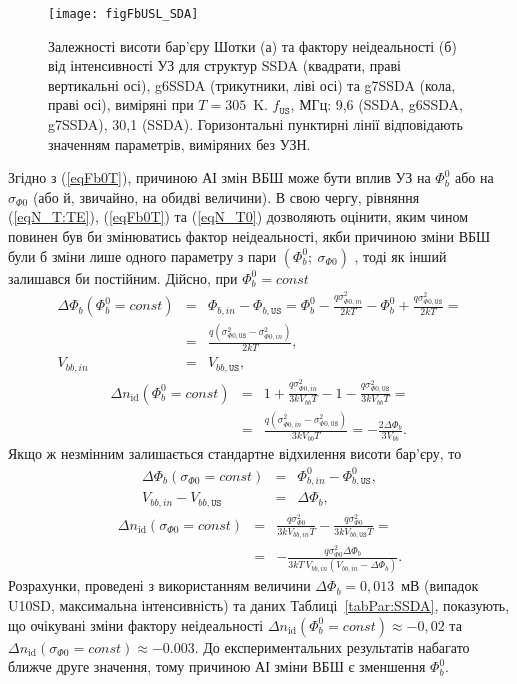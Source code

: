 \begin{figure}
\center
\texttt{[image: figFbUSL\_SDA]}
\caption{\label{figFbUSL_SDA}
Залежності висоти бар'єру Шотки (а) та фактору неідеальності (б)  від інтенсивності УЗ для
структур SSDA (квадрати, праві вертикальні осі), g6SSDA (трикутники, ліві осі) та g7SSDA (кола, праві осі), виміряні при $T=305$~K.
$f_\mathtt{US}$, МГц: 9,6 (SSDA, g6SSDA, g7SSDA), 30,1 (SSDA).
Горизонтальні пунктирні лінії відповідають значенням параметрів, виміряних без УЗН.
}%
\end{figure}

Згідно з (\ref{eqFb0T}), причиною АІ змін ВБШ може бути вплив УЗ на $\Phi_b^0$ або на $\sigma_{\Phi0}$ (або й, звичайно, на обидві величини).
В свою чергу, рівняння  (\ref{eqN_T:TE}), (\ref{eqFb0T}) та (\ref{eqN_T0}) дозволяють оцінити, яким чином повинен був би змінюватись фактор неідеальності,
якби причиною зміни ВБШ були б зміни лише одного параметру з пари $(\Phi_b^0;\:\sigma_{\Phi0})$ , тоді як інший залишався би постійним.
Дійсно, при $\Phi_b^0=const$
\begin{eqnarray*}
  \Delta \Phi_b (\Phi_b^0=const)&=& \Phi_{b,in}-\Phi_{b,\mathtt{US}}=\Phi_b^0-\frac{q\sigma^2_{\Phi0,in}}{2kT}-\Phi_b^0+\frac{q\sigma^2_{\Phi0,\mathtt{US}}}{2kT}= \\
   &=&\frac{q\left(\sigma^2_{\Phi0,\mathtt{US}}-\sigma^2_{\Phi0,in}\right)}{2kT}, \\
   V_{bb,in}&=&V_{bb,\mathtt{US}},
\end{eqnarray*}
\begin{eqnarray*}
  \Delta n_{\mathrm{id}} (\Phi_b^0=const)&=&1+\frac{q\sigma_{\Phi0,in}^2}{3kV_{bb}T}-1-\frac{q\sigma_{\Phi0,\mathtt{US}}^2}{3kV_{bb}T}=\\
  &=&\frac{q\left(\sigma^2_{\Phi0,in}-\sigma^2_{\Phi0,\mathtt{US}}\right)}{3kV_{bb}T}=-\frac{2\Delta \Phi_b}{3V_{bb}}.
\end{eqnarray*}
Якщо ж незмінним залишається стандартне відхилення висоти бар'єру, то
\begin{eqnarray*}
  \Delta \Phi_b (\sigma_{\Phi0}=const)&=&\Phi_{b,in}^0-\Phi_{b,\mathtt{US}}^0,\\
  V_{bb,in}-V_{bb,\mathtt{US}}&=&\Delta \Phi_b,
\end{eqnarray*}
\begin{eqnarray*}
  \Delta n_{\mathrm{id}} (\sigma_{\Phi0}=const)&=&\frac{q\sigma_{\Phi0}^2}{3kV_{bb,in}T}-\frac{q\sigma_{\Phi0}^2}{3kV_{bb,\mathtt{US}}T}=\\
  &=&-\frac{q\sigma_{\Phi0}^2\Delta \Phi_b}{3kT\,V_{bb,in}(V_{bb,in}-\Delta \Phi_b)}.
\end{eqnarray*}
Розрахунки, проведені з використанням величини $\Delta \Phi_b=0,013$~мВ (випадок U10SD, максимальна інтенсивність) та даних Таблиці~\ref{tabPar:SSDA},
показують, що очікувані зміни фактору неідеальності $\Delta n_{\mathrm{id}} (\Phi_b^0=const)\approx-0,02$ та \mbox{$\Delta n_{\mathrm{id}}(\sigma_{\Phi0}=const)\approx-0.003$}.
До експериментальних результатів набагато ближче друге значення, тому причиною АІ зміни ВБШ є зменшення $\Phi_b^0$.

